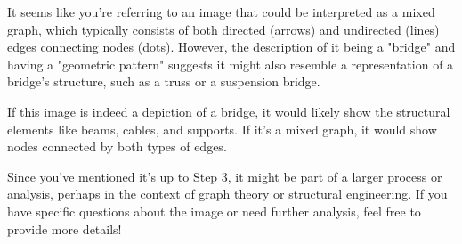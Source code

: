 It seems like you're referring to an image that could be interpreted as a mixed graph, which typically consists of both directed (arrows) and undirected (lines) edges connecting nodes (dots). However, the description of it being a "bridge" and having a "geometric pattern" suggests it might also resemble a representation of a bridge's structure, such as a truss or a suspension bridge.

If this image is indeed a depiction of a bridge, it would likely show the structural elements like beams, cables, and supports. If it's a mixed graph, it would show nodes connected by both types of edges.

Since you've mentioned it's up to Step 3, it might be part of a larger process or analysis, perhaps in the context of graph theory or structural engineering. If you have specific questions about the image or need further analysis, feel free to provide more details!